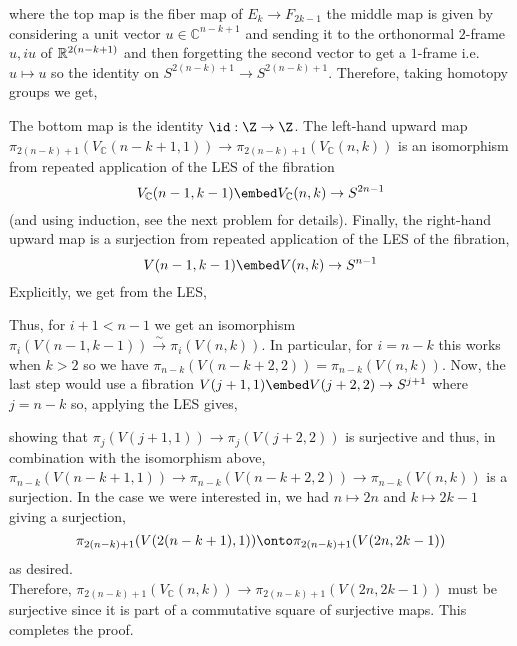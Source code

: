 \documentclass[12pt]{extarticle}
\newcommand{\C}{\mathbb{C}}
\begin{document}
where the top map is the fiber map of $E_k \to F_{2k - 1}$ the middle map is given by considering a unit vector $u \in \C^{n - k + 1}$ and sending it to the orthonormal $2$-frame $u, iu$ of $\mathbb{R}^{2(n - k + 1)}$ and then forgetting the second vector to get a $1$-frame i.e. $u \mapsto u$ so the identity on $S^{2(n - k) + 1} \to S^{2(n - k) + 1}$. Therefore, taking homotopy groups we get,
\begin{center}
\end{center}
The bottom map is the identity $\id : \Z \to \Z$. The left-hand upward map $\pi_{2(n-k) + 1}(V_\C(n - k + 1, 1)) \to \pi_{2(n-k) + 1}(V_\C(n, k))$ is an isomorphism from repeated application of the LES of the fibration
\[ V_\C(n - 1, k - 1) \embed V_\C(n, k) \to S^{2n - 1} \]
(and using induction, see the next problem for details). Finally, the right-hand upward map is a surjection from repeated application of the LES of the fibration,
\[ V(n - 1, k - 1) \embed V(n, k) \to S^{n - 1} \] Explicitly, we get from the LES,
\begin{center}
\end{center}
Thus, for $i + 1 < n - 1$ we get an isomorphism $\pi_i(V(n - 1, k - 1)) \xrightarrow{\sim} \pi_i(V(n, k))$. In particular, for $i = n - k$ this works when $k > 2$ so we have $\pi_{n-k}(V(n - k + 2, 2)) = \pi_{n-k}(V(n, k))$. Now, the last step would use a fibration $V(j + 1, 1) \embed V(j + 2, 2) \to S^{j+1}$ where $j = n - k$ so, applying the LES gives,
\begin{center}
\end{center} 
showing that $\pi_j(V(j + 1, 1)) \to \pi_j(V(j + 2, 2))$ is surjective and thus, in combination with the isomorphism above, $\pi_{n-k}(V(n - k + 1, 1)) \to \pi_{n-k}(V(n - k + 2, 2)) \to \pi_{n - k}(V(n, k))$ is a surjection. In the case we were interested in, we had $n \mapsto 2n$ and $k \mapsto 2k - 1$ giving a surjection,
\[ \pi_{2(n - k) + 1}(V(2(n - k + 1), 1)) \onto \pi_{2(n - k) + 1}(V(2n, 2k - 1)) \]
as desired. 
\bigskip\\
Therefore, $\pi_{2(n-k) + 1}(V_\C(n, k)) \to \pi_{2(n-k) + 1}(V(2n, 2k - 1))$ must be surjective since it is part of a commutative square of surjective maps. This completes the proof.
\end{document}
